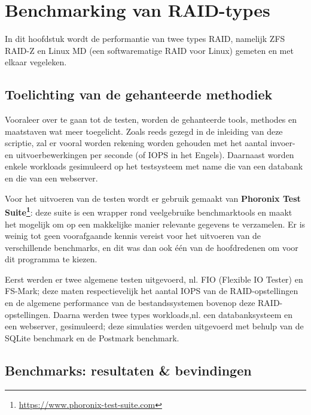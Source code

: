

\chapter{Benchmarking van RAID-types}
\label{ch:h8}

In dit hoofdstuk wordt de performantie van twee types RAID, namelijk ZFS RAID-Z en Linux MD (een softwarematige RAID voor Linux) gemeten en met elkaar vegeleken.

\section{Toelichting van de gehanteerde methodiek}

Vooraleer over te gaan tot de testen, worden de gehanteerde tools, methodes en maatstaven wat meer toegelicht. Zoals reeds gezegd in de inleiding van deze scriptie, zal er vooral worden rekening worden gehouden met het aantal invoer- en uitvoerbewerkingen per seconde (of IOPS in het Engels). Daarnaast worden enkele workloads gesimuleerd op het testsysteem met name die van een databank en die van een webserver.  

Voor het uitvoeren van de testen wordt er gebruik gemaakt van \textbf{Phoronix Test Suite\footnote{\url{https://www.phoronix-test-suite.com}}}: deze suite is een wrapper rond veelgebruike benchmarktools en maakt het mogelijk om op een makkelijke manier relevante gegevens te verzamelen. Er is weinig tot geen voorafgaande kennis vereist voor het uitvoeren van de verschillende benchmarks, en dit was dan ook één van de hoofdredenen om voor dit programma te kiezen. 

Eerst werden er twee algemene testen uitgevoerd, nl. FIO (Flexible IO Tester) en FS-Mark; deze maten respectievelijk het aantal IOPS van de RAID-opstellingen en de algemene performance van de bestandssystemen bovenop deze RAID-opstellingen. Daarna werden twee types workloads,nl. een databanksysteem en een webserver, gesimuleerd; deze simulaties werden uitgevoerd met behulp van de SQLite benchmark en de Postmark benchmark.

\section{Benchmarks: resultaten \& bevindingen}

